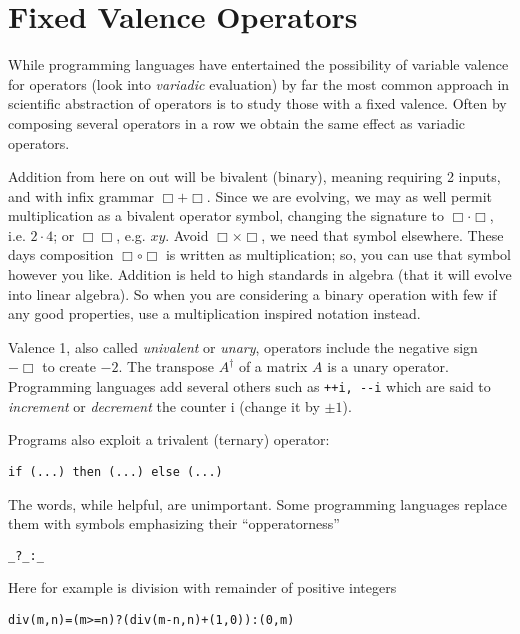 

\section{Fixed Valence Operators}
While programming languages have entertained the possibility of 
variable valence for operators (look into \emph{variadic} evaluation)
by far the most common approach in scientific abstraction of operators 
is to study those with a fixed valence.  Often by composing several 
operators in a row we obtain the same effect as  variadic 
operators.  

Addition from here on out will be bivalent (binary), meaning 
requiring 2 inputs, and with infix grammar $\Box +\Box$.
Since we are evolving, we may as well permit multiplication as a bivalent operator
symbol, changing the signature to $\Box \cdot \Box$, i.e. $2\cdot 4$; or
$\Box\Box$, e.g. $xy$.   Avoid $\Box\times \Box$, we need that symbol elsewhere.
These days composition $\Box\circ\Box$ is written as multiplication; so, you can
use that symbol however you like.  Addition is held to high standards in algebra
(that it will evolve into linear algebra).  So when you are considering a binary
operation with few if any good properties, use a multiplication inspired
notation instead.   




Valence 1, also called \emph{univalent} or \emph{unary}, operators include the negative sign $-\Box$ to create 
$-2$.  The transpose $A^{\dagger}$ of a matrix $A$ is a unary operator.  Programming languages add several others 
such as \lstinline{++i, --i} which are said to \emph{increment} 
or \emph{decrement} the counter i (change it by $\pm 1$).

Programs also exploit a trivalent (ternary) operator:
\begin{center}
    \lstinline[language=Sava]{if (...) then (...) else (...)}
\end{center}
The words, while helpful, are unimportant.  Some programming languages 
replace them with symbols emphasizing their ``opperatorness'' 
\begin{center}
    \lstinline[language=Sava]{_?_:_}
\end{center}
Here for example is division with remainder of positive integers
\begin{center}
\begin{lstlisting}[language=Sava,mathescape]
div(m,n)=(m>=n)?(div(m-n,n)+(1,0)):(0,m)
\end{lstlisting}
\end{center}

